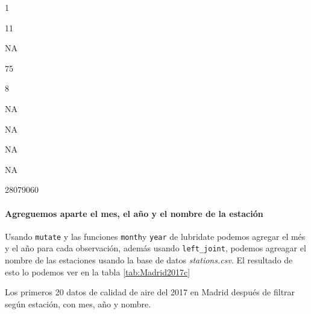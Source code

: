 \documentclass[]{book}
\newenvironment{Shaded}{\begin{snugshade}}{\end{snugshade}}
\newcommand{\DataTypeTok}[1]{\textcolor[rgb]{0.13,0.29,0.53}{#1}}
\newcommand{\DecValTok}[1]{\textcolor[rgb]{0.00,0.00,0.81}{#1}}
\newcommand{\KeywordTok}[1]{\textcolor[rgb]{0.13,0.29,0.53}{\textbf{#1}}}
\newcommand{\NormalTok}[1]{#1}
\newcommand{\OperatorTok}[1]{\textcolor[rgb]{0.81,0.36,0.00}{\textbf{#1}}}
\newcommand{\StringTok}[1]{\textcolor[rgb]{0.31,0.60,0.02}{#1}}
\let\oldparagraph\paragraph
\renewcommand{\paragraph}[1]{\oldparagraph{#1}\mbox{}}
\begin{document}
1

11

NA

75

8

NA

NA

NA

NA

28079060

\hypertarget{agreguemos-aparte-el-mes-el-ano-y-el-nombre-de-la-estacion}{%
\paragraph{Agreguemos aparte el mes, el año y el nombre de la
estación}\label{agreguemos-aparte-el-mes-el-ano-y-el-nombre-de-la-estacion}}

Usando \texttt{mutate} y las funciones \texttt{month}y \texttt{year} de
lubridate podemos agregar el més y el año para cada observación, además
usando \texttt{left\_joint}, podemos agreagar el nombre de las
estaciones usando la base de datos \emph{stations.csv}. El resultado de
esto lo podemos ver en la tabla \ref{tab:Madrid2017c}

\begin{Shaded}
\end{Shaded}

\label{tab:Madrid2017c}Los primeros 20 datos de calidad de aire del 2017 en
Madrid después de filtrar según estación, con mes, año y nombre.
\end{document}
